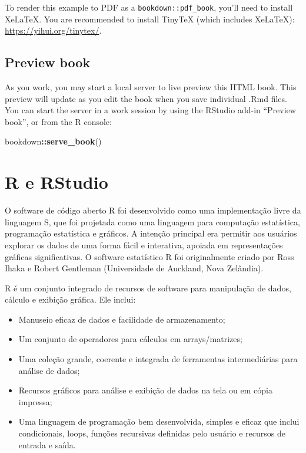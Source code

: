 \documentclass[
]{book}
\newenvironment{Shaded}{\begin{snugshade}}{\end{snugshade}}
\newcommand{\FunctionTok}[1]{\textcolor[rgb]{0.13,0.29,0.53}{\textbf{#1}}}
\newcommand{\NormalTok}[1]{#1}
\newcommand{\SpecialCharTok}[1]{\textcolor[rgb]{0.81,0.36,0.00}{\textbf{#1}}}
\theoremstyle{definition}
\theoremstyle{definition}
\theoremstyle{definition}
\theoremstyle{definition}
\theoremstyle{remark}
\begin{document}
To render this example to PDF as a \texttt{bookdown::pdf\_book}, you'll need to install XeLaTeX. You are recommended to install TinyTeX (which includes XeLaTeX): \url{https://yihui.org/tinytex/}.

\section{Preview book}\label{preview-book}

As you work, you may start a local server to live preview this HTML book. This preview will update as you edit the book when you save individual .Rmd files. You can start the server in a work session by using the RStudio add-in ``Preview book'', or from the R console:

\begin{Shaded}
\begin{Highlighting}[]
\NormalTok{bookdown}\SpecialCharTok{::}\FunctionTok{serve\_book}\NormalTok{()}
\end{Highlighting}
\end{Shaded}

\chapter{R e RStudio}\label{r-e-rstudio}

O software de código aberto R foi desenvolvido como uma implementação livre da linguagem S, que foi projetada como uma linguagem para computação estatística, programação estatística e gráficos. A intenção principal era permitir aos usuários explorar os dados de uma forma fácil e interativa, apoiada em representações gráficas significativas. O software estatístico R foi originalmente criado por Ross Ihaka e Robert Gentleman (Universidade de Auckland, Nova Zelândia).

R é um conjunto integrado de recursos de software para manipulação de dados, cálculo e exibição gráfica. Ele inclui:

\begin{itemize}
\item
  Manuseio eficaz de dados e facilidade de armazenamento;
\item
  Um conjunto de operadores para cálculos em arrays/matrizes;
\item
  Uma coleção grande, coerente e integrada de ferramentas intermediárias para análise de dados;
\item
  Recursos gráficos para análise e exibição de dados na tela ou em cópia impressa;
\item
  Uma linguagem de programação bem desenvolvida, simples e eficaz que inclui condicionais, loops, funções recursivas definidas pelo usuário e recursos de entrada e saída.
\end{itemize}
\end{document}
